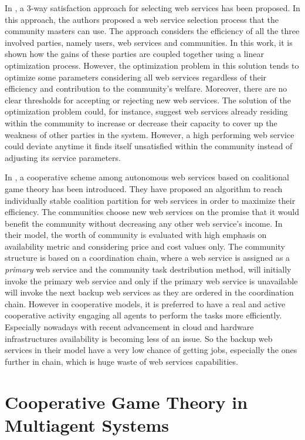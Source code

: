In \cite{DBLP:conf/IEEEscc/LimTMB12}, a 3-way satisfaction approach
for selecting web services has been proposed. In this approach,
the authors proposed a web service selection process that the
community masters can use. The approach considers the efficiency
of all the three involved parties, namely users, web services and
communities. In this work, it is shown how the gains of these
parties are coupled together using a linear optimization process.
However, the optimization problem in this solution tends to
optimize some parameters considering all web services regardless
of their efficiency and contribution to the community's welfare.
Moreover, there are no clear thresholds for accepting or rejecting
new web services. The solution of the optimization problem could,
for instance, suggest web services already residing within the
community to increase or decrease their capacity to cover up the
weakness of other parties in the system. However, a high
performing web service could deviate anytime it finds itself
unsatisfied within the community instead of adjusting its service
parameters.

In \cite{10.1109/TSC.2012.12}, a cooperative scheme among autonomous
web services based on coalitional game theory has been introduced. They have proposed an algorithm to
reach individually stable coalition partition for web services in order to
maximize their efficiency. The communities choose new web services on the promise
that it would benefit the community without decreasing any other web service's
income. In their model, the worth of community is evaluated with high emphasis on
availability metric and considering price and cost values only. The community structure is based on a coordination chain,
where a web service is assigned as a \emph{primary} web service and the community task destribution
method, will initially invoke the primary web service and only if the primary web service is unavailable
will invoke the next backup web services as they are ordered in the coordination chain. However in cooperative models, it is preferred to
have a real and active cooperative activity engaging all agents to perform the tasks more efficiently. Especially nowadays
with recent advancement in cloud and hardware infrastructures availability is becoming less of an issue. So the backup web services
in their model have a very low chance of getting jobs, especially the ones further in chain, which is huge waste of web services
capabilities.

    \section{Cooperative Game Theory in Multiagent Systems}\label{sec:CGTMS}


